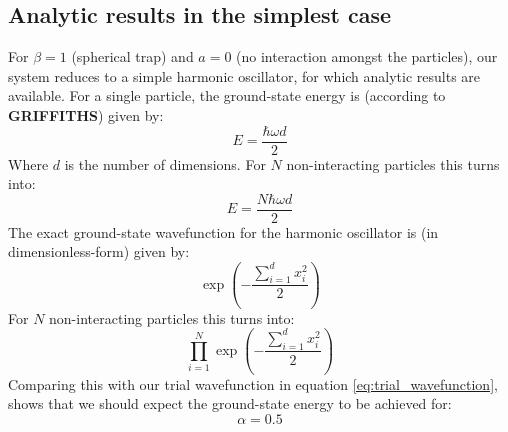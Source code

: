 \documentclass[a4paper, 10pt]{article}
\begin{document}
	\subsection{Analytic results in the simplest case}
	For $\beta=1$ (spherical trap) and $a=0$ (no interaction amongst the particles), our system reduces to a simple harmonic oscillator, for which analytic results are available. For a single particle, the ground-state energy is (according to \textbf{GRIFFITHS}) given by:
	\begin{equation}
	E=\frac{\hbar \omega d}{2}
	\end{equation}
	Where $d$ is the number of dimensions. For $N$ non-interacting particles this turns into:
	\begin{equation}\label{eq:Exact_Energy_N_particles}
	E=\frac{N\hbar \omega d}{2}
	\end{equation}
	The exact ground-state wavefunction for the harmonic oscillator is (in dimensionless-form) given by:
	\begin{equation}
	\exp\left(-\frac{\sum_{i=1}^d x_i^2}{2}\right)
	\end{equation}
	For $N$ non-interacting particles this turns into:
	\begin{equation}
	\prod_{i=1}^N 	\exp\left(-\frac{\sum_{i=1}^d x_i^2}{2}\right)
	\end{equation}
	Comparing this with our trial wavefunction in equation \ref{eq:trial_wavefunction}, shows that we should expect the ground-state energy to be achieved for:
	\begin{equation}\label{eq:exact_alpha}
	\alpha=0.5
	\end{equation}
\end{document}
